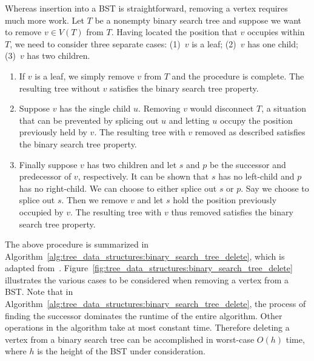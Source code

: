 \noindent
Whereas insertion into a BST is straightforward, removing a vertex
requires much more work. Let $T$ be a nonempty binary search tree and
suppose we want to remove $v \in V(T)$ from $T$. Having located the
position that $v$ occupies within $T$, we need to consider three
separate cases: (1)~$v$ is a leaf; (2)~$v$ has one child; (3)~$v$ has
two children.
\begin{enumerate}
\item If $v$ is a leaf, we simply remove $v$ from $T$ and the
  procedure is complete. The resulting tree without $v$ satisfies the
  binary search tree property.

\item Suppose $v$ has the single child $u$. Removing $v$ would
  disconnect $T$, a situation that can be prevented by splicing out
  $u$ and letting $u$ occupy the position previously held by $v$. The
  resulting tree with $v$ removed as described satisfies the binary
  search tree property.

\item Finally suppose $v$ has two children and let $s$ and $p$ be the
  successor and predecessor of $v$, respectively. It can be shown that
  $s$ has no left-child and $p$ has no right-child. We can choose to
  either splice out $s$ or $p$. Say we choose to splice out $s$. Then
  we remove $v$ and let $s$ hold the position previously occupied by
  $v$. The resulting tree with $v$ thus removed satisfies the binary
  search tree property.
\end{enumerate}
The above procedure is summarized in
Algorithm~\ref{alg:tree_data_structures:binary_search_tree_delete},
which is adapted from~\cite[p.262]{CormenEtAl2001}.
Figure~\ref{fig:tree_data_structures:binary_search_tree_delete}
illustrates the various cases to be considered when removing a vertex
from a BST. Note that in
Algorithm~\ref{alg:tree_data_structures:binary_search_tree_delete},
the process of finding the successor dominates the runtime of the
entire algorithm. Other operations in the algorithm take at most
constant time. Therefore deleting a vertex from a binary search tree
can be accomplished in worst-case $O(h)$ time, where $h$ is the height
of the BST under consideration.

